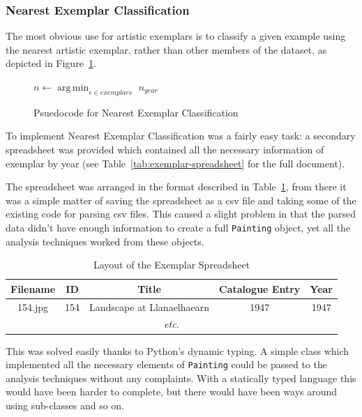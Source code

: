 \subsubsection{Nearest Exemplar Classification}
The most obvious use for artistic exemplars is to classify a given example using the nearest 
artistic exemplar, rather than other members of the dataset, as depicted in 
Figure~\ref{fig:nearest-exemplar}.

\begin{figure}[h]
\begin{algorithmic}
\State $n \gets \operatorname*{arg\,min}_{e \in exemplars}$ 
\State \Return $n_{year}$
\EndFunction
\end{algorithmic}
\caption{Psuedocode for Nearest Exemplar Classification}\label{fig:nearest-exemplar}
\end{figure}

To implement Nearest Exemplar Classification was a fairly easy task: a secondary spreadsheet was 
provided which contained all the necessary information of exemplar by year (see 
Table~\ref{tab:exemplar-spreadsheet} for the full document).

The spreadsheet was arranged in the format described in Table~\ref{tab:exemplar-layout}, from
there it was a simple matter of saving the spreadsheet as a \gls{csv} file and taking some of the
existing code for parsing \gls{csv} files. This caused a slight problem in that the parsed data
didn't have enough information to create a full \texttt{Painting} object, yet all the analysis
techniques worked from these objects.

\begin{table}[h]
\centering
\begin{tabular}{|c|c|c|c|c|} \hline
Filename & ID  & Title                      & Catalogue Entry & Year \\\hline
154.jpg  & 154 & Landscape at Llanaelhaearn & 1947            & 1947 \\\hline
\multicolumn{5}{|c|}{\textit{etc.}}\\\hline
\end{tabular}
\caption{Layout of the Exemplar Spreadsheet}\label{tab:exemplar-layout}
\end{table}

This was solved easily thanks to Python's dynamic typing. A simple class which implemented all the
necessary elements of \texttt{Painting} could be passed to the analysis techniques without any
complaints. With a statically typed language this would have been harder to complete, but there
would have been ways around using sub-classes and so on.

